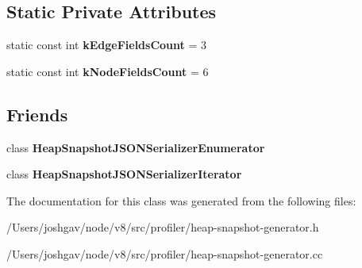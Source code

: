 \subsection*{Static Private Attributes}
\begin{DoxyCompactItemize}
\item 
static const int {\bfseries k\+Edge\+Fields\+Count} = 3\hypertarget{classv8_1_1internal_1_1_heap_snapshot_j_s_o_n_serializer_a9b25e0827aa8f592b49de029bfe16798}{}\label{classv8_1_1internal_1_1_heap_snapshot_j_s_o_n_serializer_a9b25e0827aa8f592b49de029bfe16798}

\item 
static const int {\bfseries k\+Node\+Fields\+Count} = 6\hypertarget{classv8_1_1internal_1_1_heap_snapshot_j_s_o_n_serializer_ab9701e8fca6b9efa0defae1ba93863db}{}\label{classv8_1_1internal_1_1_heap_snapshot_j_s_o_n_serializer_ab9701e8fca6b9efa0defae1ba93863db}

\end{DoxyCompactItemize}
\subsection*{Friends}
\begin{DoxyCompactItemize}
\item 
class {\bfseries Heap\+Snapshot\+J\+S\+O\+N\+Serializer\+Enumerator}\hypertarget{classv8_1_1internal_1_1_heap_snapshot_j_s_o_n_serializer_aa8f0fed181b2cbcc6d42bb03ef455db5}{}\label{classv8_1_1internal_1_1_heap_snapshot_j_s_o_n_serializer_aa8f0fed181b2cbcc6d42bb03ef455db5}

\item 
class {\bfseries Heap\+Snapshot\+J\+S\+O\+N\+Serializer\+Iterator}\hypertarget{classv8_1_1internal_1_1_heap_snapshot_j_s_o_n_serializer_a8044648e3cab653e8d53f7d5d11eaa80}{}\label{classv8_1_1internal_1_1_heap_snapshot_j_s_o_n_serializer_a8044648e3cab653e8d53f7d5d11eaa80}

\end{DoxyCompactItemize}


The documentation for this class was generated from the following files\+:\begin{DoxyCompactItemize}
\item 
/\+Users/joshgav/node/v8/src/profiler/heap-\/snapshot-\/generator.\+h\item 
/\+Users/joshgav/node/v8/src/profiler/heap-\/snapshot-\/generator.\+cc\end{DoxyCompactItemize}
